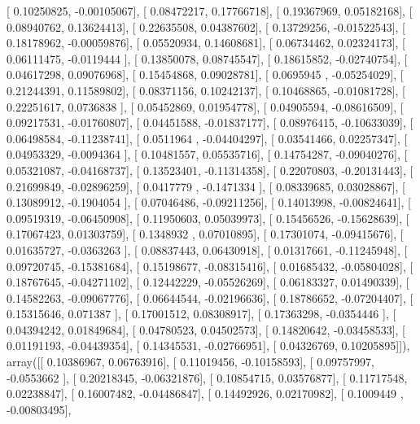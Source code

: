 \documentclass{article}
\begin{document}
       [ 0.10250825, -0.00105067],
       [ 0.08472217,  0.17766718],
       [ 0.19367969,  0.05182168],
       [ 0.08940762,  0.13624413],
       [ 0.22635508,  0.04387602],
       [ 0.13729256, -0.01522543],
       [ 0.18178962, -0.00059876],
       [ 0.05520934,  0.14608681],
       [ 0.06734462,  0.02324173],
       [ 0.06111475, -0.0119444 ],
       [ 0.13850078,  0.08745547],
       [ 0.18615852, -0.02740754],
       [ 0.04617298,  0.09076968],
       [ 0.15454868,  0.09028781],
       [ 0.0695945 , -0.05254029],
       [ 0.21244391,  0.11589802],
       [ 0.08371156,  0.10242137],
       [ 0.10468865, -0.01081728],
       [ 0.22251617,  0.0736838 ],
       [ 0.05452869,  0.01954778],
       [ 0.04905594, -0.08616509],
       [ 0.09217531, -0.01760807],
       [ 0.04451588, -0.01837177],
       [ 0.08976415, -0.10633039],
       [ 0.06498584, -0.11238741],
       [ 0.0511964 , -0.04404297],
       [ 0.03541466,  0.02257347],
       [ 0.04953329, -0.0094364 ],
       [ 0.10481557,  0.05535716],
       [ 0.14754287, -0.09040276],
       [ 0.05321087, -0.04168737],
       [ 0.13523401, -0.11314358],
       [ 0.22070803, -0.20131443],
       [ 0.21699849, -0.02896259],
       [ 0.0417779 , -0.1471334 ],
       [ 0.08339685,  0.03028867],
       [ 0.13089912, -0.1904054 ],
       [ 0.07046486, -0.09211256],
       [ 0.14013998, -0.00824641],
       [ 0.09519319, -0.06450908],
       [ 0.11950603,  0.05039973],
       [ 0.15456526, -0.15628639],
       [ 0.17067423,  0.01303759],
       [ 0.1348932 ,  0.07010895],
       [ 0.17301074, -0.09415676],
       [ 0.01635727, -0.0363263 ],
       [ 0.08837443,  0.06430918],
       [ 0.01317661, -0.11245948],
       [ 0.09720745, -0.15381684],
       [ 0.15198677, -0.08315416],
       [ 0.01685432, -0.05804028],
       [ 0.18767645, -0.04271102],
       [ 0.12442229, -0.05526269],
       [ 0.06183327,  0.01490339],
       [ 0.14582263, -0.09067776],
       [ 0.06644544, -0.02196636],
       [ 0.18786652, -0.07204407],
       [ 0.15315646,  0.071387  ],
       [ 0.17001512,  0.08308917],
       [ 0.17363298, -0.0354446 ],
       [ 0.04394242,  0.01849684],
       [ 0.04780523,  0.04502573],
       [ 0.14820642, -0.03458533],
       [ 0.01191193, -0.04439354],
       [ 0.14345531, -0.02766951],
       [ 0.04326769,  0.10205895]]), array([[ 0.10386967,  0.06763916],
       [ 0.11019456, -0.10158593],
       [ 0.09757997, -0.0553662 ],
       [ 0.20218345, -0.06321876],
       [ 0.10854715,  0.03576877],
       [ 0.11717548,  0.02238847],
       [ 0.16007482, -0.04486847],
       [ 0.14492926,  0.02170982],
       [ 0.1009449 , -0.00803495],
\end{document}
